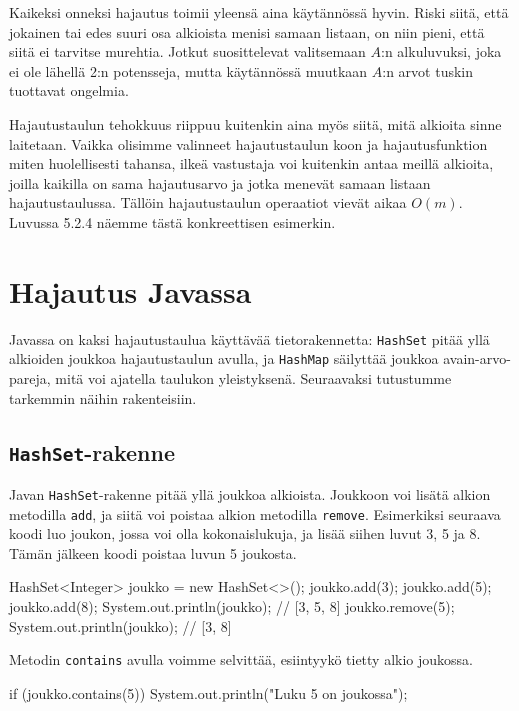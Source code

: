 Kaikeksi onneksi hajautus toimii yleensä aina käytännössä hyvin.
Riski siitä, että jokainen tai edes suuri osa alkioista
menisi samaan listaan, on niin pieni,
että siitä ei tarvitse murehtia.
Jotkut suosittelevat valitsemaan $A$:n alkuluvuksi,
joka ei ole lähellä 2:n potensseja,
mutta käytännössä muutkaan $A$:n arvot tuskin
tuottavat ongelmia.

Hajautustaulun tehokkuus riippuu kuitenkin aina myös siitä,
mitä alkioita sinne laitetaan.
Vaikka olisimme valinneet hajautustaulun koon ja
hajautusfunktion miten huolellisesti tahansa,
ilkeä vastustaja voi kuitenkin antaa meillä alkioita,
joilla kaikilla on sama hajautusarvo ja jotka
menevät samaan listaan hajautustaulussa.
Tällöin hajautustaulun operaatiot vievät aikaa $O(m)$.
Luvussa 5.2.4 näemme tästä konkreettisen esimerkin.

\section{Hajautus Javassa}

Javassa on kaksi hajautustaulua käyttävää tietorakennetta:
\texttt{HashSet} pitää yllä alkioiden joukkoa
hajautustaulun avulla, ja \texttt{HashMap} säilyttää
joukkoa avain-arvo-pareja, mitä voi ajatella taulukon yleistyksenä.
Seuraavaksi tutustumme tarkemmin näihin rakenteisiin.

\subsection{\texttt{HashSet}-rakenne}

Javan \texttt{HashSet}-rakenne pitää yllä joukkoa alkioista.
Joukkoon voi lisätä alkion metodilla \texttt{add},
ja siitä voi poistaa alkion metodilla \texttt{remove}.
Esimerkiksi seuraava koodi luo joukon, jossa voi olla
kokonaislukuja, ja lisää siihen luvut 3, 5 ja 8.
Tämän jälkeen koodi poistaa luvun 5 joukosta.

\begin{code}
HashSet<Integer> joukko = new HashSet<>();
joukko.add(3);
joukko.add(5);
joukko.add(8);
System.out.println(joukko); // [3, 5, 8]
joukko.remove(5);
System.out.println(joukko); // [3, 8]
\end{code}

Metodin \texttt{contains} avulla voimme selvittää,
esiintyykö tietty alkio joukossa.

\begin{code}
if (joukko.contains(5)) {
    System.out.println("Luku 5 on joukossa");
}
\end{code}

